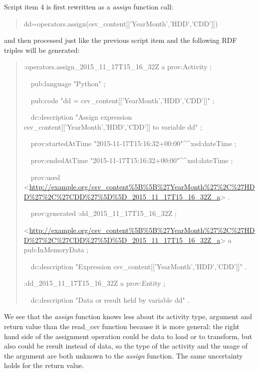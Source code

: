 Script item 4 is first rewritten as a \emph{assign} function call:
\begin{quotation}
	\noindent dd=operators.assign(csv\_content[['YearMonth','HDD','CDD']])
\end{quotation}
and then processed just like the previous script item and the following RDF triples will be generated:
\begin{quotation}
	\noindent:operators.assign\_2015\_11\_17T15\_16\_32Z a prov:Activity ;
	
	\noindent \ \ pub:language "Python" ;
	
	\noindent \ \ pub:code "dd = csv\_content[['YearMonth','HDD','CDD']]" ;
	
	\noindent \ \ dc:description "Assign expression csv\_content[['YearMonth','HDD','CDD']] to variable dd" ;
	
	\noindent \ \ prov:startedAtTime "2015-11-17T15:16:32+00:00"\^{}\^{}xsd:dateTime ;
	
	\noindent \ \ prov:endedAtTime "2015-11-17T15:16:32+00:00"\^{}\^{}xsd:dateTime ;
	
	\noindent \ \ prov:used <\url{http://example.org/csv_content%5B%5B%27YearMonth%27%2C%27HDD%27%2C%27CDD%27%5D%5D_2015_11_17T15_16_32Z_a}> .
		
	\noindent \ \ prov:generated :dd\_2015\_11\_17T15\_16\_32Z ;
	
	\noindent<\url{http://example.org/csv_content%5B%5B%27YearMonth%27%2C%27HDD%27%2C%27CDD%27%5D%5D_2015_11_17T15_16_32Z_a}> a pub:InMemoryData ;
		
	\noindent\ \ dc:description "Expression csv\_content[['YearMonth','HDD','CDD']]" .

	\noindent:dd\_2015\_11\_17T15\_16\_32Z a prov:Entity ;

	\noindent\ \ dc:description "Data or result held by variable dd" .
\end{quotation}
We see that the \emph{assign} function knows less about its activity type, argument and return value than the read\_csv function because it is more general: the right hand side of the assignment operation could be data to load or to transform, but also could be result instead of data, so the type of the activity and the usage of the argument are both unknown to the \emph{assign} function. The same uncertainty holds for the return value.

